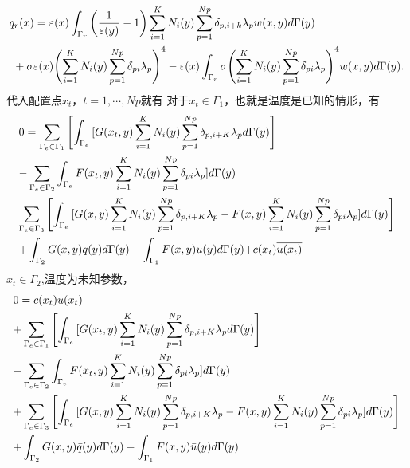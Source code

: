 \[\begin{gathered}
  {q_r}(x) = \varepsilon (x)\int_{{\Gamma _r}} {\left( {\frac{1}{{\varepsilon (y)}} - 1} \right)\sum\limits_{i = 1}^K {{N_i}(y)\sum\limits_{p = 1}^{Np} {{\delta _{p,i + k}}{\lambda _p}} } w(x,y)d\Gamma (y)}  \hfill \\
  {\text{           }} + \sigma \varepsilon (x){\left( {\sum\limits_{i = 1}^K {{N_i}(y)\sum\limits_{p = 1}^{Np} {{\delta _{pi}}{\lambda _p}} } } \right)^4} - \varepsilon (x)\int_{{\Gamma _r}} {\sigma {{\left( {\sum\limits_{i = 1}^K {{N_i}(y)\sum\limits_{p = 1}^{Np} {{\delta _{pi}}{\lambda _p}} } } \right)}^4}w(x,y)d\Gamma (y)} . \hfill \\ 
\end{gathered} \]
代入配置点${x_t}$，$t = 1, \cdots ,Np$就有
对于${x_t} \in {\Gamma _1}$，也就是温度是已知的情形，有
\[\begin{gathered}
  0 = \sum\limits_{{\Gamma _e} \in {\Gamma _1}}^{} {\left[ {\int_{{\Gamma _e}}^{} {[G({x_t},y)\sum\limits_{i = 1}^K {{N_i}(y)\sum\limits_{p = 1}^{Np} {{\delta _{p,i + K}}{\lambda _p}} } d\Gamma (y)} } \right]}  \hfill \\
   - \sum\limits_{{\Gamma _e} \in {\Gamma _2}} {\int_{{\Gamma _e}}^{} {F({x_t},y)\sum\limits_{i = 1}^K {{N_i}(y)\sum\limits_{p = 1}^{Np} {{\delta _{pi}}{\lambda _p}} } ]d\Gamma (y)} }  \hfill \\
  \sum\limits_{{\Gamma _e} \in {\Gamma _3}}^{} {\left[ {\int_{{\Gamma _e}}^{} {[G(x,y)\sum\limits_{i = 1}^K {{N_i}(y)\sum\limits_{p = 1}^{Np} {{\delta _{p,i + K}}{\lambda _p}} }  - F(x,y)\sum\limits_{i = 1}^K {{N_i}(y)\sum\limits_{p = 1}^{Np} {{\delta _{pi}}{\lambda _p}} } ]d\Gamma (y)} } \right]}  \hfill \\
   + \int_{{\Gamma _2}}^{} {G(x,y)\bar q(y)d\Gamma (y) - \int_{{\Gamma _1}}^{} {F(x,y)\bar u(y)d\Gamma (y) + } c({x_t})\overline {u({x_t})} }  \hfill \\ 
\end{gathered} \]
${x_t} \in {\Gamma _2}$,温度为未知参数，
\[\begin{gathered}
  0 = c({x_t})u({x_t}) \hfill \\
   + \sum\limits_{{\Gamma _e} \in {\Gamma _1}}^{} {\left[ {\int_{{\Gamma _e}}^{} {[G({x_t},y)\sum\limits_{i = 1}^K {{N_i}(y)\sum\limits_{p = 1}^{Np} {{\delta _{p,i + K}}{\lambda _p}} } d\Gamma (y)} } \right]}  \hfill \\
   - \sum\limits_{{\Gamma _e} \in {\Gamma _2}} {\int_{{\Gamma _e}}^{} {F({x_t},y)\sum\limits_{i = 1}^K {{N_i}(y)\sum\limits_{p = 1}^{Np} {{\delta _{pi}}{\lambda _p}} } ]d\Gamma (y)} }  \hfill \\
   + \sum\limits_{{\Gamma _e} \in {\Gamma _3}}^{} {\left[ {\int_{{\Gamma _e}}^{} {[G(x,y)\sum\limits_{i = 1}^K {{N_i}(y)\sum\limits_{p = 1}^{Np} {{\delta _{p,i + K}}{\lambda _p}} }  - F(x,y)\sum\limits_{i = 1}^K {{N_i}(y)\sum\limits_{p = 1}^{Np} {{\delta _{pi}}{\lambda _p}} } ]d\Gamma (y)} } \right]}  \hfill \\
   + \int_{{\Gamma _2}}^{} {G(x,y)\bar q(y)d\Gamma (y) - \int_{{\Gamma _1}}^{} {F(x,y)\bar u(y)d\Gamma (y)} }  \hfill \\ 
\end{gathered} \]
